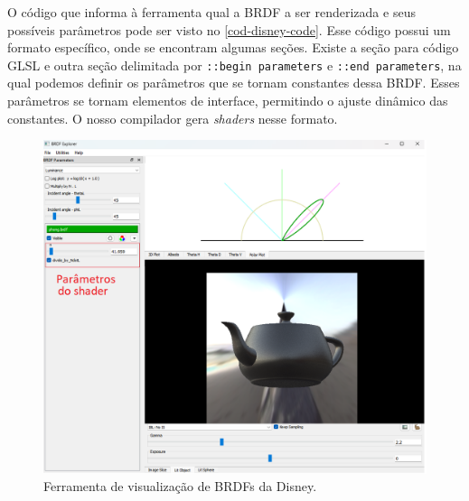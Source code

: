 O código que informa à ferramenta qual a BRDF a ser renderizada e seus possíveis parâmetros pode ser visto no \autoref{cod-disney-code}. Esse código possui um formato específico, onde se encontram algumas seções.
Existe a seção para código GLSL e outra seção delimitada por \texttt{::begin parameters} e \texttt{::end parameters}, na qual podemos definir os parâmetros que se tornam constantes dessa BRDF. Esses parâmetros se tornam elementos de interface, permitindo o ajuste dinâmico das constantes. O nosso compilador gera \textit{shaders} nesse formato.



\begin{figure}[htb]
        \caption{\label{fig-disney-tool} \small Ferramenta de visualização de BRDFs da Disney.}
        \begin{center}
            \includegraphics[scale=0.55]{./Imagens/disney-tool-new.png}
        \end{center}
\end{figure}

